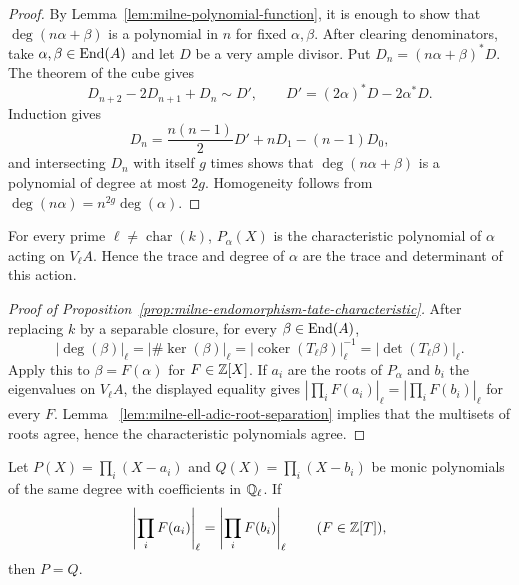 \begin{proof}
By Lemma~\ref{lem:milne-polynomial-function}, it is enough to show that
$\deg(n\alpha+\beta)$ is a polynomial in $n$ for fixed $\alpha,\beta$.
After clearing denominators, take $\alpha,\beta\in\operatorname{End}(A)$ and let $D$ be a
very ample divisor.  Put $D_n=(n\alpha+\beta)^*D$.  The theorem of the cube
gives
\[
  D_{n+2}-2D_{n+1}+D_n\sim D',
  \qquad D'=(2\alpha)^*D-2\alpha^*D.
\]
Induction gives
\[
 D_n=\frac{n(n-1)}2D'+nD_1-(n-1)D_0,
\]
and intersecting $D_n$ with itself $g$ times shows that
$\deg(n\alpha+\beta)$ is a polynomial of degree at most $2g$.  Homogeneity
follows from $\deg(n\alpha)=n^{2g}\deg(\alpha)$.
\end{proof}

\begin{proposition}
\label{prop:milne-endomorphism-tate-characteristic}

For every prime $\ell\ne\operatorname{char}(k)$, $P_\alpha(X)$ is the
characteristic polynomial of $\alpha$ acting on $V_\ell A$.  Hence the trace
and degree of $\alpha$ are the trace and determinant of this action.
\end{proposition}

\begin{proof}[Proof of Proposition~\ref{prop:milne-endomorphism-tate-characteristic}]
After replacing $k$ by a separable closure, for every $\beta\in\operatorname{End}(A)$,
\[
|\deg(\beta)|_\ell=|\#\ker(\beta)|_\ell
 =|\operatorname{coker}(T_\ell\beta)|_\ell^{-1}
 =|\det(T_\ell\beta)|_\ell.
\]
Apply this to $\beta=F(\alpha)$ for $F\in\mathbb{Z}[X]$.  If $a_i$ are the roots of
$P_\alpha$ and $b_i$ the eigenvalues on $V_\ell A$, the displayed equality
gives $|\prod_iF(a_i)|_\ell=|\prod_iF(b_i)|_\ell$ for every $F$.  Lemma~
\ref{lem:milne-ell-adic-root-separation} implies that the multisets of roots
agree, hence the characteristic polynomials agree.
\end{proof}

\begin{lemma}
\label{lem:milne-ell-adic-root-separation}

Let $P(X)=\prod_i(X-a_i)$ and $Q(X)=\prod_i(X-b_i)$ be monic polynomials
of the same degree with coefficients in $\mathbb{Q}_\ell$.  If
\[
\left|\prod_iF(a_i)\right|_\ell
=\left|\prod_iF(b_i)\right|_\ell
\qquad(F\in\mathbb{Z}[T]),
\]
then $P=Q$.
\end{lemma}

